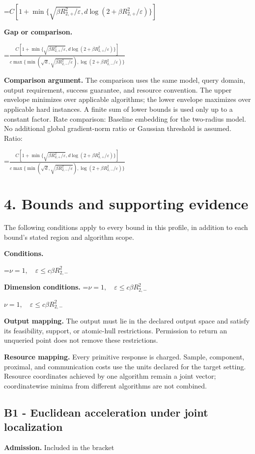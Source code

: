 \documentclass[10pt,a4paper]{article}
\newcommand{\AtlasMath}[1]{\par\begingroup\centering\setbox0=\hbox{$\displaystyle #1$}\ifdim\wd0>1.4\linewidth\typeout{ATLAS WIDE FORMULA: \the\wd0}\fi\ifdim\wd0>\linewidth\resizebox{\linewidth}{!}{\box0}\else\box0\fi\par\endgroup}
\newcommand{\AtlasInlineMath}[1]{\begingroup\setbox0=\hbox{$#1$}\ifdim\wd0>.4\linewidth\endgroup\AtlasMath{#1}\else\endgroup$#1$\fi}
\begin{document}
\AtlasMath{C[1+\min\{\sqrt{\beta R_{2,+}^2/\varepsilon},d\log(2+\beta R_{2,+}^2/\varepsilon)\}]}
\textbf{Gap or comparison.} 
\AtlasMath{\frac{C[1+\min\{\sqrt{\beta R_{2,+}^2/\varepsilon},d\log(2+\beta R_{2,+}^2/\varepsilon)\}]}{c\max\{\min(\sqrt d,\sqrt{\beta R_{2,-}^2/\varepsilon}),\log(2+\beta R_{2,-}^2/\varepsilon)\}}}


\textbf{Comparison argument.} The comparison uses the same model, query domain, output requirement, success guarantee, and resource convention. The upper envelope minimizes over applicable algorithms; the lower envelope maximizes over applicable hard instances. A finite sum of lower bounds is used only up to a constant factor. Rate comparison: Baseline embedding for the two-radius model. No additional global gradient-norm ratio or Gaussian threshold is assumed. Ratio: 
\AtlasMath{\frac{C[1+\min\{\sqrt{\beta R_{2,+}^2/\varepsilon},d\log(2+\beta R_{2,+}^2/\varepsilon)\}]}{c\max\{\min(\sqrt d,\sqrt{\beta R_{2,-}^2/\varepsilon}),\log(2+\beta R_{2,-}^2/\varepsilon)\}}}


\section{4. Bounds and supporting evidence}
The following conditions apply to every bound in this profile, in addition to each bound's stated region and algorithm scope.

\textbf{Conditions.} 
\AtlasMath{\nu=1,\quad\varepsilon\le c\beta R_{2,-}^2}


\textbf{Dimension conditions.} \AtlasInlineMath{\nu=1,\quad\varepsilon\le c\beta R_{2,-}^2}

\textbf{Output mapping.} The output must lie in the declared output space and satisfy its feasibility, support, or atomic-hull restrictions. Permission to return an unqueried point does not remove these restrictions.

\textbf{Resource mapping.} Every primitive response is charged. Sample, component, proximal, and communication costs use the units declared for the target setting. Resource coordinates achieved by one algorithm remain a joint vector; coordinatewise minima from different algorithms are not combined.

\subsection{B1 - Euclidean acceleration under joint localization}
\textbf{Admission.} Included in the bracket
\end{document}
